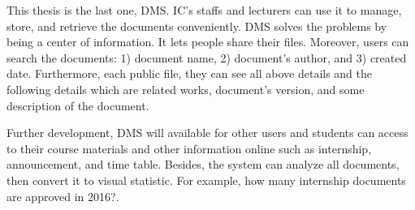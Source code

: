 This thesis is the last one, DMS. IC's staffs and lecturers can use it to manage, store, and retrieve the documents conveniently. DMS solves the problems by being a center of information. It lets people share their files. Moreover, users can search the documents: 1) document name, 2) document's author, and 3) created date.
Furthermore, each public file, they can see all above details and the following details which are related works, document's version, and some description of the document. %


Further development, DMS will available for other users and students can access to their course materials and other information online such as internship, announcement, and time table. Besides, the system can analyze all documents, then convert it to visual statistic. For example, how many internship documents are approved in 2016?.